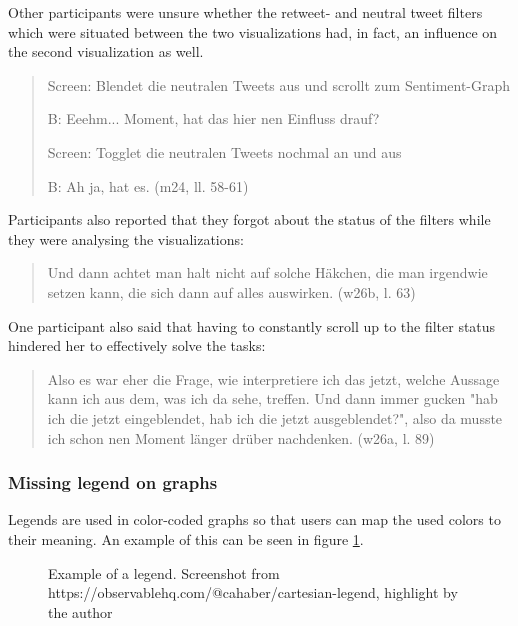 Other participants were unsure whether the retweet- and neutral tweet filters which were situated between the two visualizations had, in fact, an influence on the second visualization as well.

\begin{quote}
    Screen: Blendet die neutralen Tweets aus und scrollt zum Sentiment-Graph

    B: Eeehm... Moment, hat das hier nen Einfluss drauf?

    Screen: Togglet die neutralen Tweets nochmal an und aus

    B: Ah ja, hat es. (m24, ll. 58-61)
\end{quote}

Participants also reported that they forgot about the status of the filters while they were analysing the visualizations:

\begin{quote}
    Und dann achtet man halt nicht auf solche Häkchen, die man irgendwie setzen kann, die sich dann auf alles auswirken. (w26b, l. 63)
\end{quote}

One participant also said that having to constantly scroll up to the filter status hindered her to effectively solve the tasks:

\begin{quote}
    Also es war eher die Frage, wie interpretiere ich das jetzt, welche Aussage kann ich aus dem, was ich da sehe, treffen. Und dann immer gucken "hab ich die jetzt eingeblendet, hab ich die jetzt ausgeblendet?", also da musste ich schon nen Moment länger drüber nachdenken. (w26a, l. 89)
\end{quote}

\subsubsection*{Missing legend on graphs}
Legends are used in color-coded graphs so that users can map the used colors to their meaning. An example of this can be seen in figure \ref{fig:legend_example}.

\begin{figure}[h!tb]
    \caption{Example of a legend. Screenshot from https://observablehq.com/@cahaber/cartesian-legend, highlight by the author}
    \label{fig:legend_example}
\end{figure}

